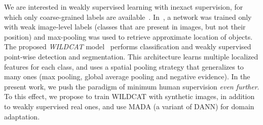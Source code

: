 \documentclass[letterpaper, 10 pt, conference]{ieeeconf}  %
\newcommand{\phil}[1]{\textcolor{blue}{#1}}
\newcommand{\jp}[1]{\textcolor{orange}{#1}}
\begin{document}
We are interested in weakly supervised learning with inexact supervision, for which only coarse-grained labels are available~\cite{zhou2017brief}. In~\cite{oquab2015object}, a network was trained only with weak image-level labels (classes that are present in images, but not their position) and max-pooling was used to retrieve approximate location of objects. The proposed {\it WILDCAT} model~\cite{durand2017wildcat} performs classification and weakly supervised point-wise detection and segmentation. This architecture learns multiple localized features for each class, and uses a spatial pooling strategy that generalizes to many ones (max pooling, global average pooling and negative evidence). In the present work, we push the paradigm of minimum human supervision \emph{even further}. To this effect, we propose to train WILDCAT with synthetic images, in addition to weakly supervised real ones, and use MADA (a variant of DANN) for domain adaptation.
\end{document}

